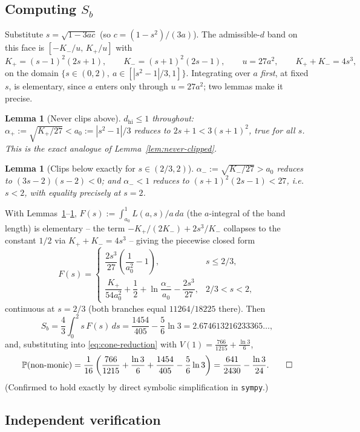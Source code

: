 \documentclass[11pt,reqno]{amsart}
\theoremstyle{plain}
\newtheorem{lemma}[theorem]{Lemma}
\theoremstyle{remark}
\newcommand{\Prb}{\mathbb{P}}
\begin{document}
\subsection{Computing $S_b$}

Substitute $s=\sqrt{1-3ac}$ (so $c=(1-s^2)/(3a)$). The admissible-$d$ band on
this face is $[-K_-/u,\,K_+/u]$ with
\[
  K_+=(s-1)^2(2s+1),\qquad K_-=(s+1)^2(2s-1),\qquad u=27a^2,\qquad K_++K_-=4s^3,
\]
on the domain $\{s\in(0,2),\ a\in[|s^2-1|/3,1]\}$. Integrating over $a$
\emph{first}, at fixed $s$, is elementary, since $a$ enters only through
$u=27a^2$; two lemmas make it precise.

\begin{lemma}[Never clips above] \label{lem:L1}
$d_{\mathrm{hi}}\le1$ throughout: $\alpha_+:=\sqrt{K_+/27}<a_0:=|s^2-1|/3$
reduces to $2s+1<3(s+1)^2$, true for all $s$. This is the exact analogue of
Lemma~\ref{lem:never-clipped}.
\end{lemma}

\begin{lemma}[Clips below exactly for $s\in(2/3,2)$] \label{lem:L2}
$\alpha_-:=\sqrt{K_-/27}>a_0$ reduces to $(3s-2)(s-2)<0$; and $\alpha_-<1$
reduces to $(s+1)^2(2s-1)<27$, i.e.\ $s<2$, with equality precisely at
$s=2$.
\end{lemma}

With Lemmas~\ref{lem:L1}--\ref{lem:L2}, $F(s):=\int_{a_0}^1 L(a,s)/a\,da$ (the
$a$-integral of the band length) is elementary -- the term
$-K_+/(2K_-)+2s^3/K_-$ collapses to the constant $1/2$ via $K_++K_-=4s^3$ --
giving the piecewise closed form
\[
  F(s)=
  \begin{cases}
    \dfrac{2s^3}{27}\left(\dfrac{1}{a_0^2}-1\right), & s\le2/3, \\[2ex]
    \dfrac{K_+}{54a_0^2}+\dfrac12+\ln\dfrac{\alpha_-}{a_0}-\dfrac{2s^3}{27}, & 2/3<s<2,
  \end{cases}
\]
continuous at $s=2/3$ (both branches equal $11264/18225$ there). Then
\[
  S_b = \frac43\int_0^2 s\,F(s)\,ds = \frac{1454}{405}-\frac56\ln3
      = 2.674613216233365\ldots,
\]
and, substituting into \eqref{eq:cone-reduction} with
$V(1)=\tfrac{766}{1215}+\tfrac{\ln3}{6}$,
\[
  \Prb(\text{non-monic}) = \frac{1}{16}\left(\frac{766}{1215}+\frac{\ln3}{6}+\frac{1454}{405}-\frac56\ln3\right)
  = \frac{641}{2430}-\frac{\ln3}{24}. \qedhere
\]
(Confirmed to hold exactly by direct symbolic simplification in \texttt{sympy}.)

\subsection{Independent verification}
\end{document}
